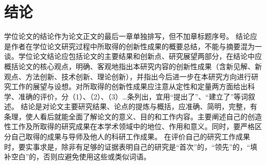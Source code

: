 \chapter*{结\quad 论}

学位论文的结论作为论文正文的最后一章单独排写，但不加章标题序号。
结论应是作者在学位论文研究过程中所取得的创新性成果的概要总结，不能与摘要混为一谈。学位论文结论应包括论文的主要结果和创新点、研究展望两部分，在结论中应概括论文的核心观点，明确、客观地指出本研究内容的创新性成果（含新见解、新观点、方法创新、技术创新、理论创新），并指出今后进一步在本研究方向进行研究工作的展望与设想。对所取得的创新性成果应注意从定性和定量两方面给出科学、准确的评价，分（1）、（2）、（3）…条列出，宜用“提出了”、“建立了”等词叙述。
结论是对论文主要研究结果、论点的提炼与概括，应准确、简明，完整，有条理，使人看后就能全面了解论文的意义、目的和工作内容。主要阐述自己的创造性工作及所取得的研究成果在本学术领域中的地位、作用和意义。同时，要严格区分自己取得的成果与导师及他人的科研工作成果。
在评价自己的研究工作成果时，要实事求是，除非有足够的证据表明自己的研究是“首次”的，“领先”的，“填补空白”的，否则应避免使用这些或类似词语。

